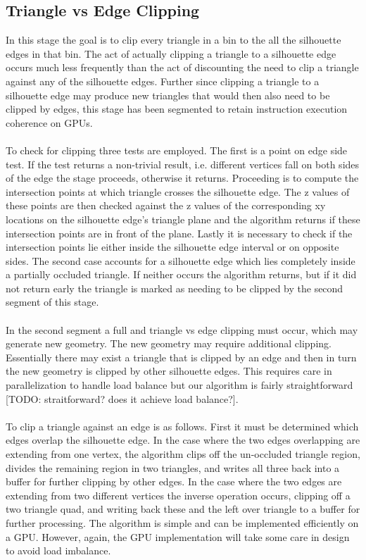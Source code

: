 \documentclass[review]{acmsiggraph}
\begin{document}
\subsection{Triangle vs Edge Clipping}
	In this stage the goal is to clip every triangle in a bin to the all the silhouette edges in that bin. The act of actually clipping a triangle to a silhouette edge occurs much less frequently than the act of discounting the need to clip a triangle against any of the silhouette edges. Further since clipping a triangle to a silhouette edge may produce new triangles that would then also need to be clipped by edges, this stage has been segmented to retain instruction execution coherence on GPUs.
\\\\
To check for clipping three tests are employed. The first is a point on edge side test. If the test returns a non-trivial result, i.e. different vertices fall on both sides of the edge the stage proceeds, otherwise it returns. Proceeding is to compute the intersection points at which triangle crosses the silhouette edge. The z values of these points are then checked against the z values of the corresponding xy locations on the silhouette edge’s triangle plane and the algorithm returns if these intersection points are in front of the plane. Lastly it is necessary to check if the intersection points lie either inside the silhouette edge interval or on opposite sides. The second case accounts for a silhouette edge which lies completely inside a partially occluded triangle. If neither occurs the algorithm returns, but if it did not return early the triangle is marked as needing to be clipped by the second segment of this stage.
	\\\\
In the second segment a full and triangle vs edge clipping must occur, which may generate new geometry. The new geometry may require additional clipping. Essentially there may exist a triangle that is clipped by an edge and then in turn the new geometry is clipped by other silhouette edges. This requires care in parallelization to handle load balance but our algorithm is fairly straightforward [TODO: straitforward? does it achieve load balance?].
\\\\
To clip a triangle against an edge is as follows. First it must be determined which edges overlap the silhouette edge. In the case where the two edges overlapping are extending from one vertex, the algorithm clips off the un-occluded triangle region, divides the remaining region in two triangles, and writes all three back into a buffer for further clipping by other edges. In the case where the two edges are extending from two different vertices the inverse operation occurs, clipping off a two triangle quad, and writing back these and the left over triangle to a buffer for further processing. The algorithm is simple and can be implemented efficiently on a GPU. However, again, the GPU implementation will take some care in design to avoid load imbalance.
\end{document}
